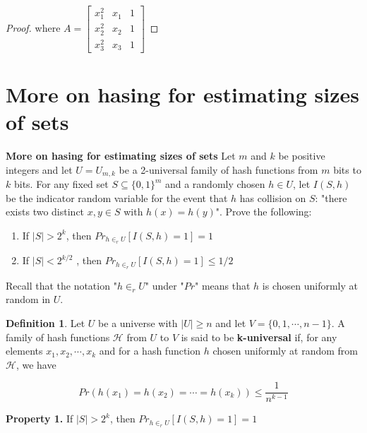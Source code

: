 \documentclass[12pt, a4paper]{article} %
\theoremstyle{definition}
\newtheorem{definition}{Definition}[section]
\begin{document}
\begin{proof}
where $A = \begin{bmatrix} x_1^2 & x_1 & 1\\ x_2^2 & x_2 & 1\\ x_3^2 & x_3 & 1 \end{bmatrix}$

\end{proof}


\newpage

\section{More on hasing for estimating sizes of sets}

\textbf{More on hasing for estimating sizes of sets} \quad Let $m$ and $k$ be positive integers and let $U = U_{m,k}$ be a 2-universal family of hash functions from $m$ bits to $k$ bits. For any fixed set $S \subseteq \{0,1\}^m$ and a randomly chosen $h \in U$, let $I(S,h)$ be the indicator random variable for the event that $h$ has collision on $S$: "there exists two distinct $x,y \in S$ with $h(x) = h(y)$". Prove the following:

\begin{enumerate}
  \item If $|S| > 2^{k}$, then $Pr_{h \in_r U} [I(S,h) = 1] = 1$ \label{prop:one}
  \item If $|S| < 2^{k/2}$ , then $Pr_{h \in_r U} [I(S,h) = 1] \leq 1/2$ \label{prop:two}
\end{enumerate}

Recall that the notation "$h \in_r U$" under "$Pr$" means that $h$ is chosen uniformly at random in $U$.

\begin{definition}
  Let $U$ be a universe with $|U| \geq n$ and let $V = \{0,1,\cdots, n- 1\}$. A family of hash functions $\mathcal{H}$ from $U$ to $V$ is said to be \textbf{k-universal} if, for any elements $x_1, x_2, \cdots, x_k$ and for a hash function $h$ chosen uniformly at random from $\mathcal{H}$, we have

  \[ Pr(h(x_1) = h(x_2) = \cdots = h(x_k)) \leq \frac{1}{n^{k-1}} \]
\end{definition}

\textbf{Property 1.} \quad If $|S| > 2^{k}$, then $Pr_{h \in_r U} [I(S,h) = 1] = 1$
\end{document}
